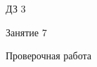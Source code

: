 \begin{homework}[number=3]
	\begin{listofex}
		\item ДЗ 3
	\end{listofex}
\end{homework}

\begin{class}[number=7]
	\begin{listofex}
		\item Занятие 7
	\end{listofex}
\end{class}

\begin{exam}
	\begin{listofex}
		\item Проверочная работа
	\end{listofex}
\end{exam}
